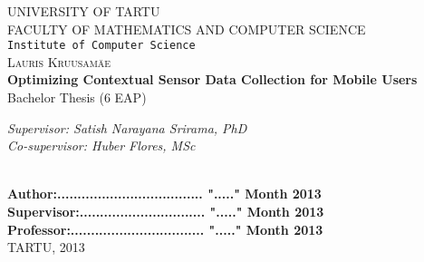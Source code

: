 \begin{titlepage}

\begin{center}



\textsc{UNIVERSITY OF TARTU}\\

\textsc{FACULTY OF MATHEMATICS AND COMPUTER SCIENCE}\\

\texttt{Institute of Computer Science}\\[5cm]

\textsc{ \large Lauris Kruusamäe}\\[0.5cm]
{\Huge \bfseries Optimizing Contextual Sensor Data Collection for Mobile Users}\\[0.5cm]
{\large Bachelor Thesis (6 EAP)}\\[3cm]



\begin{minipage}{0.8\textwidth}
\begin{flushright} \large
\emph{Supervisor: Satish Narayana Srirama, PhD}  \\	  %
\emph{Co-supervisor: Huber Flores, MSc}  %
\end{flushright}
\end{minipage}

\textbf{}\\[1.0cm]

\textbf{Author:.................................... "....." Month   2013}\\[0.5cm]

\textbf{Supervisor:............................... "....." Month   2013}\\[0.5cm]

\textbf{Professor:................................. "....." Month   2013}\\[0.5cm]        

\vfill
{\large TARTU, 2013}

\end{center}

\end{titlepage}
